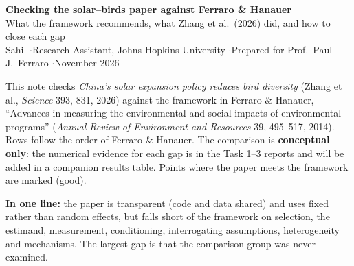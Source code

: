 \documentclass[10pt]{article}
\begin{document}
\begin{center}
{\LARGE\bfseries Checking the solar--birds paper against Ferraro \& Hanauer}\\[5pt]
{\large What the framework recommends, what Zhang et al.\ (2026) did, and how to close each gap}\\[7pt]
Sahil \quad$\cdot$\quad Research Assistant, Johns Hopkins University \quad$\cdot$\quad Prepared for Prof.\ Paul J.\ Ferraro \quad$\cdot$\quad November 2026
\end{center}

\begin{tcolorbox}[colback=boxgray,colframe=jhublue,boxrule=0.6pt,arc=2pt,left=6pt,right=6pt,top=4pt,bottom=4pt,title=\textbf{Purpose and scope}]
\small
This note checks \emph{China's solar expansion policy reduces bird diversity} (Zhang et al., \textit{Science} 393, 831, 2026) against the framework in Ferraro \& Hanauer, ``Advances in measuring the environmental and social impacts of environmental programs'' (\textit{Annual Review of Environment and Resources} 39, 495--517, 2014). Rows follow the order of Ferraro \& Hanauer. The comparison is \textbf{conceptual only}: the numerical evidence for each gap is in the Task 1--3 reports and will be added in a companion results table. Points where the paper meets the framework are marked \textcolor{okgreen}{(good)}.

\smallskip
\textbf{In one line:} the paper is transparent (code and data shared) and uses fixed rather than random effects, but falls short of the framework on selection, the estimand, measurement, conditioning, interrogating assumptions, heterogeneity and mechanisms. The largest gap is that the comparison group was never examined.
\end{tcolorbox}
\end{document}
